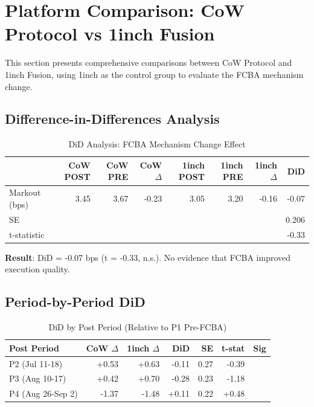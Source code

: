 \documentclass[11pt,a4paper]{article}
\begin{document}
\section{Platform Comparison: CoW Protocol vs 1inch Fusion}

This section presents comprehensive comparisons between CoW Protocol and 1inch Fusion, using 1inch as the control group to evaluate the FCBA mechanism change.

\subsection{Difference-in-Differences Analysis}

\begin{table}[H]
\centering
\caption{DiD Analysis: FCBA Mechanism Change Effect}
\begin{tabular}{lrrrrrrr}
\toprule
& \textbf{CoW POST} & \textbf{CoW PRE} & \textbf{CoW $\Delta$} & \textbf{1inch POST} & \textbf{1inch PRE} & \textbf{1inch $\Delta$} & \textbf{DiD} \\
\midrule
Markout (bps) & 3.45 & 3.67 & -0.23 & 3.05 & 3.20 & -0.16 & -0.07 \\
SE & & & & & & & 0.206 \\
t-statistic & & & & & & & -0.33 \\
\bottomrule
\end{tabular}
\end{table}

\textbf{Result}: DiD = -0.07 bps (t = -0.33, n.s.). No evidence that FCBA improved execution quality.

\subsection{Period-by-Period DiD}

\begin{table}[H]
\centering
\caption{DiD by Post Period (Relative to P1 Pre-FCBA)}
\begin{tabular}{lrrrrrr}
\toprule
\textbf{Post Period} & \textbf{CoW $\Delta$} & \textbf{1inch $\Delta$} & \textbf{DiD} & \textbf{SE} & \textbf{t-stat} & \textbf{Sig} \\
\midrule
P2 (Jul 11-18) & +0.53 & +0.63 & -0.11 & 0.27 & -0.39 & \\
P3 (Aug 10-17) & +0.42 & +0.70 & -0.28 & 0.23 & -1.18 & \\
P4 (Aug 26-Sep 2) & -1.37 & -1.48 & +0.11 & 0.22 & +0.48 & \\
\bottomrule
\end{tabular}
\end{table}
\end{document}
